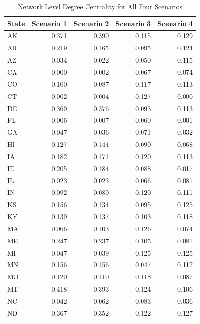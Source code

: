 \documentclass[]{article}
\begin{document}
\begin{table}[!h]

\caption{\label{tab:unnamed-chunk-78}Network Level Degree Centrality for All Four Scenarios}
\centering
\begin{tabular}{l|r|r|r|r}
\hline
State & Scenario 1 & Scenario 2 & Scenario 3 & Scenario 4\\
\hline
\rowcolor{gray!6}  AK & 0.371 & 0.390 & 0.115 & 0.129\\
\hline
AR & 0.219 & 0.165 & 0.095 & 0.124\\
\hline
\rowcolor{gray!6}  AZ & 0.034 & 0.022 & 0.050 & 0.115\\
\hline
CA & 0.000 & 0.002 & 0.067 & 0.074\\
\hline
\rowcolor{gray!6}  CO & 0.100 & 0.087 & 0.117 & 0.113\\
\hline
CT & 0.002 & 0.004 & 0.127 & 0.000\\
\hline
\rowcolor{gray!6}  DE & 0.369 & 0.376 & 0.093 & 0.113\\
\hline
FL & 0.006 & 0.007 & 0.060 & 0.001\\
\hline
\rowcolor{gray!6}  GA & 0.047 & 0.036 & 0.071 & 0.032\\
\hline
HI & 0.127 & 0.144 & 0.090 & 0.068\\
\hline
\rowcolor{gray!6}  IA & 0.182 & 0.171 & 0.120 & 0.113\\
\hline
ID & 0.205 & 0.184 & 0.088 & 0.017\\
\hline
\rowcolor{gray!6}  IL & 0.023 & 0.023 & 0.066 & 0.081\\
\hline
IN & 0.092 & 0.089 & 0.120 & 0.111\\
\hline
\rowcolor{gray!6}  KS & 0.156 & 0.134 & 0.095 & 0.125\\
\hline
KY & 0.139 & 0.137 & 0.103 & 0.118\\
\hline
\rowcolor{gray!6}  MA & 0.066 & 0.103 & 0.126 & 0.074\\
\hline
ME & 0.247 & 0.237 & 0.105 & 0.081\\
\hline
\rowcolor{gray!6}  MI & 0.047 & 0.039 & 0.125 & 0.125\\
\hline
MN & 0.156 & 0.156 & 0.047 & 0.112\\
\hline
\rowcolor{gray!6}  MO & 0.120 & 0.110 & 0.118 & 0.087\\
\hline
MT & 0.418 & 0.393 & 0.124 & 0.106\\
\hline
\rowcolor{gray!6}  NC & 0.042 & 0.062 & 0.083 & 0.036\\
\hline
ND & 0.367 & 0.352 & 0.122 & 0.127\\

\end{tabular}
\end{table}
\end{document}
